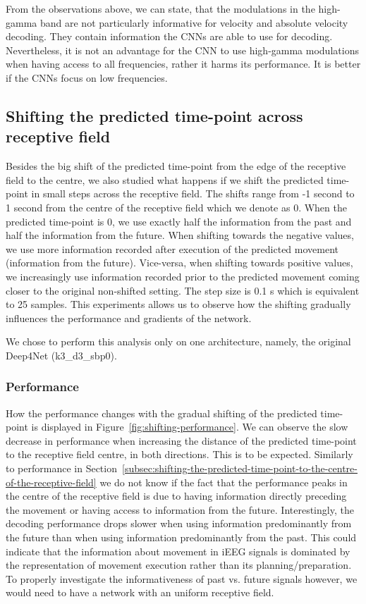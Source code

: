 From the observations above, we can state, that the modulations in the high-gamma band are not particularly informative for velocity and absolute velocity decoding.
They contain information the CNNs are able to use for decoding. 
Nevertheless, it is not an advantage for the CNN to use high-gamma modulations when having access to all frequencies, rather it harms its performance.
It is better if the CNNs focus on low frequencies.

\subsection{Shifting the predicted time-point across receptive field}\label{subsec:shifting-the-predicted-time-point-across-receptive-field}
Besides the big shift of the predicted time-point from the edge of the receptive field to the centre, we also studied what happens if we shift the predicted time-point in small steps across the receptive field. 
The shifts range from  -1 second  to 1 second from the centre of the receptive field which we denote as 0.
When the predicted time-point is 0, we use exactly half the information from the past and half the information from the future.
When shifting towards the negative values, we use more information recorded after execution of the predicted movement (information from the future). 
Vice-versa, when shifting towards positive values, we increasingly use information recorded prior to the predicted movement coming closer to the original non-shifted setting.  
The step size is 0.1 s which is equivalent to 25 samples.
This experiments allows us to observe how the shifting gradually influences the performance and gradients of the network. 

We chose to perform this analysis only on one architecture, namely, the original Deep4Net (k3\_d3\_sbp0). 

\subsubsection{Performance}\label{subsubsec:across-shiftig-performace}
How the performance changes with the gradual shifting of the predicted time-point is displayed in Figure~\ref{fig:shifting-performance}.
We can observe the slow decrease in performance when increasing the distance of the predicted time-point to the receptive field centre, in both directions. 
This is to be expected. 
Similarly to performance in Section~\ref{subsec:shifting-the-predicted-time-point-to-the-centre-of-the-receptive-field} we do not know if the fact that the performance peaks in the centre of the receptive field is due to having information directly preceding the movement or having access to information from the future. 
Interestingly, the decoding performance drops slower when using information predominantly from the future than when using information predominantly from the past. This could indicate that the information about movement in iEEG signals is dominated by the representation of movement execution rather than its planning/preparation. 
To properly investigate the informativeness of past vs. future signals however, we would need to have a network with an uniform receptive field. 

